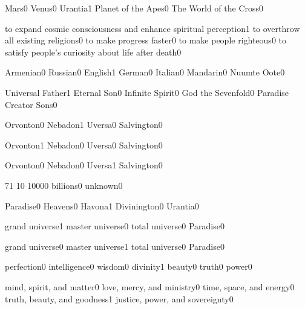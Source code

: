 \quizheader


{Mars}{0}
{Venus}{0}
{Urantia}{1}
{Planet of the Apes}{0}
{The World of the Cross}{0}
\qstop

{to expand cosmic consciousness and enhance spiritual perception}{1}
{to overthrow all existing religions}{0}
{to make progress faster}{0}
{to make people righteous}{0}
{to satisfy people's curiosity about life after death}{0}
\qstop

{Armenian}{0}
{Russian}{0}
{English}{1}
{German}{0}
{Italian}{0}
{Mandarin}{0}
{Nuumte Oote}{0}
\qstop

{Universal Father}{1}
{Eternal Son}{0}
{Infinite Spirit}{0}
{God the Sevenfold}{0}
{Paradise Creator Sons}{0}
\qstop

{Orvonton}{0}
{Nebadon}{1}
{Uversa}{0}
{Salvington}{0}
\qstop

{Orvonton}{1}
{Nebadon}{0}
{Uversa}{0}
{Salvington}{0}
\qstop

{Orvonton}{0}
{Nebadon}{0}
{Uversa}{1}
{Salvington}{0}
\qstop

{7}{1}
{1}{0}
{1000}{0}
{billions}{0}
{unknown}{0}
\qstop

{Paradise}{0}
{Heavens}{0}
{Havona}{1}
{Divinington}{0}
{Urantia}{0}
\qstop

{grand universe}{1}
{master universe}{0}
{total universe}{0}
{Paradise}{0}
\qstop

{grand universe}{0}
{master universe}{1}
{total universe}{0}
{Paradise}{0}
\qstop

{perfection}{0}
{intelligence}{0}
{wisdom}{0}
{divinity}{1}
{beauty}{0}
{truth}{0}
{power}{0}
\qstop

{mind, spirit, and matter}{0}
{love, mercy, and ministry}{0}
{time, space, and energy}{0}
{truth, beauty, and goodness}{1}
{justice, power, and sovereignty}{0}
\qstop


